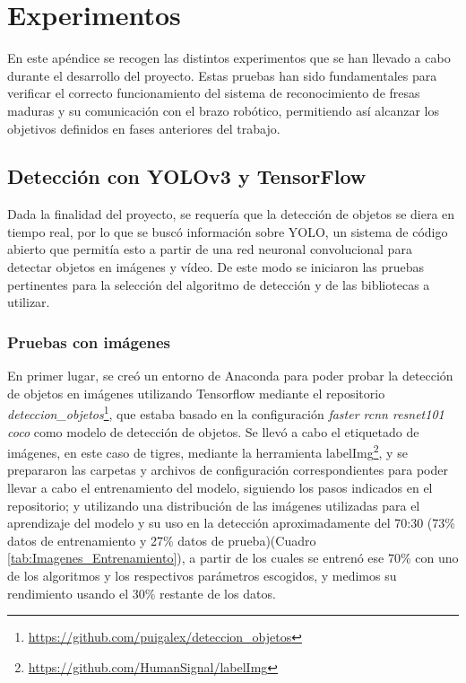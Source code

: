 \chapter{Experimentos}
\label{cap:capitulo8}

En este apéndice se recogen las distintos experimentos que se han llevado a cabo durante el desarrollo del proyecto. Estas pruebas han sido fundamentales para verificar el correcto funcionamiento del sistema de reconocimiento de fresas maduras y su comunicación con el brazo robótico, permitiendo así alcanzar los objetivos definidos en fases anteriores del trabajo.

\section{Detección con YOLOv3 y TensorFlow}
\label{exp_seleccion_algoritmo}

Dada la finalidad del proyecto, se requería que la detección de objetos se diera en tiempo real, por lo que se buscó información sobre YOLO, un sistema de código abierto que permitía esto a partir de una red neuronal convolucional para detectar objetos en imágenes y vídeo. De este modo se iniciaron las pruebas pertinentes para la selección del algoritmo de detección y de las bibliotecas a utilizar.

\subsection{Pruebas con imágenes}
\label{sec:Pruebas_imgs_TF}

En primer lugar, se creó un entorno de Anaconda para poder probar la detección de objetos en imágenes utilizando Tensorflow mediante el repositorio \textit{deteccion\_objetos}\footnote{\url{https://github.com/puigalex/deteccion_objetos}}, que estaba basado en la configuración \textit{faster rcnn resnet101 coco} como modelo de detección de objetos. Se llevó a cabo el etiquetado de imágenes, en este caso de tigres, mediante la herramienta labelImg\footnote{\url{https://github.com/HumanSignal/labelImg}}, y se prepararon las carpetas y archivos de configuración correspondientes para poder llevar a cabo el entrenamiento del modelo, siguiendo los pasos indicados en el repositorio; y utilizando una distribución de las imágenes utilizadas para el aprendizaje del modelo y su uso en la detección aproximadamente del 70:30 (73\% datos de entrenamiento y 27\% datos de prueba)(Cuadro \ref{tab:Imagenes_Entrenamiento}), a partir de los cuales se entrenó ese 70\% con uno de los algoritmos y los respectivos parámetros escogidos, y medimos su rendimiento usando el 30\% restante de los datos.\\

